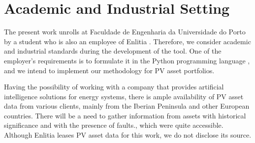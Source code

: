 \section{Academic and Industrial Setting}

The present work unrolls at Faculdade de Engenharia da Universidade do Porto by a student who is also an employee of Enlitia \cite{EL}. Therefore, we consider academic and industrial standards during the development of the tool. One of the employer's requirements is to formulate it in the Python programming language \cite{Python}, and we intend to implement our methodology for PV asset portfolios. 

Having the possibility of working with a company that provides artificial intelligence solutions for energy systems, there is ample availability of PV asset data from various clients, mainly from the Iberian Peninsula and other European countries. There will be a need to gather information from assets with historical significance and with the presence of faults., which were quite accessible. Although Enlitia leases PV asset data for this work, we do not disclose its source.
